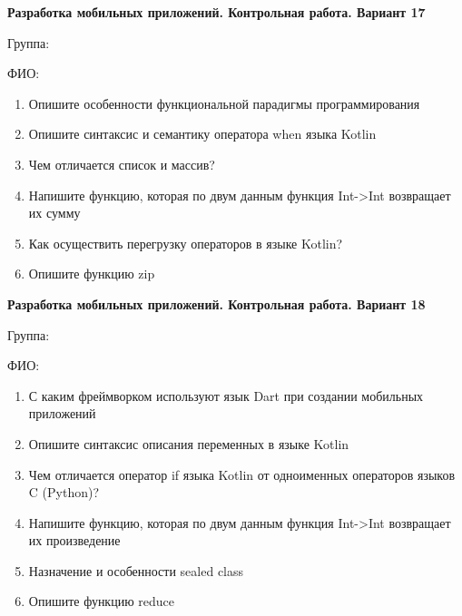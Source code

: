 \documentclass[12pt]{article}
\begin{document}
\newpage\begin{minipage}{\textwidth}
\textbf{Разработка мобильных приложений. Контрольная работа. Вариант 17}

Группа: \underline{\hspace{3cm}}

ФИО: \underline{\hspace{10cm}}

\begin{enumerate}
\item Опишите особенности функциональной парадигмы программирования
\item Опишите синтаксис и семантику оператора when языка Kotlin
\item Чем отличается список и массив?
\item Напишите функцию, которая по двум данным функция Int->Int возвращает их сумму
\item Как осуществить перегрузку операторов в языке Kotlin?
\item Опишите функцию zip

\end{enumerate}
\end{minipage}

\newpage\begin{minipage}{\textwidth}
\textbf{Разработка мобильных приложений. Контрольная работа. Вариант 18}

Группа: \underline{\hspace{3cm}}

ФИО: \underline{\hspace{10cm}}

\begin{enumerate}
\item С каким фреймворком используют язык Dart при создании мобильных приложений
\item Опишите синтаксис описания переменных в языке Kotlin
\item Чем отличается оператор if языка Kotlin от одноименных операторов языков C (Python)?
\item Напишите функцию, которая по двум данным функция Int->Int возвращает их произведение
\item Назначение и особенности sealed class
\item Опишите функцию reduce

\end{enumerate}
\end{minipage}
\end{document}
